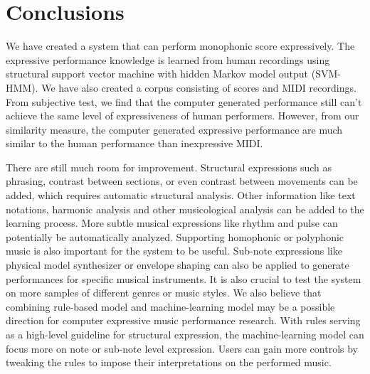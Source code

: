 \chapter{Conclusions}
\label{chap:conclusion}
We have created a system that can perform monophonic score expressively. The expressive performance knowledge is learned from human recordings using structural support vector machine with hidden Markov model output (SVM-HMM). We have also created a corpus consisting of scores and MIDI recordings.  From subjective test, we find that the computer generated performance still can't achieve the same level of expressiveness of human performers. However, from our similarity measure, the computer generated expressive performance are much similar to the human performance than inexpressive MIDI. %

There are still much room for improvement. Structural expressions such as phrasing, contrast between sections, or even contrast between movements can be added, which requires automatic structural analysis. Other information like text notations, harmonic analysis and other musicological analysis can be added to the learning process. More subtle musical expressions like rhythm and pulse can potentially be automatically analyzed. Supporting homophonic or polyphonic music is also important for the system to be useful. Sub-note expressions like physical model synthesizer or envelope shaping can also be applied to generate performances for specific musical instruments. It is also crucial to test the system on more samples of different genres or music styles. We also believe that combining rule-based model and machine-learning model may be a possible direction for computer expressive music performance research. With rules serving as a high-level guideline for structural expression, the machine-learning model can focus more on note or sub-note level expression. Users can gain more controls by tweaking the rules to impose their interpretations on the performed music.


